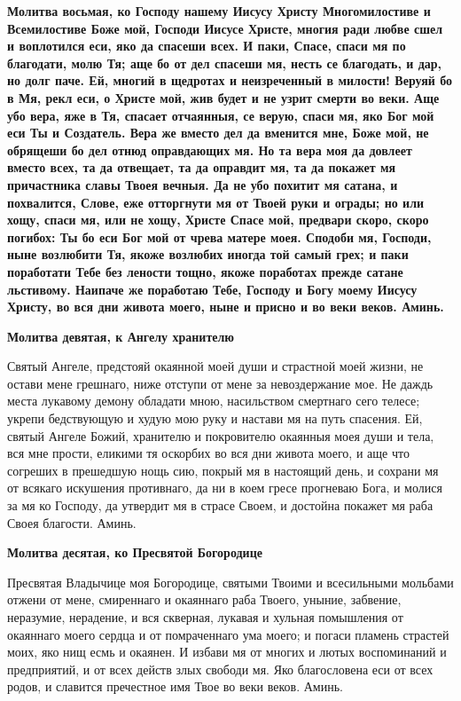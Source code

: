 \medskip
\bfseries Молитва восьмая, ко Господу нашему Иисусу Христу\normalfont{}
Многомилостиве и Всемилостиве Боже мой, Господи Иисусе Христе, многия ради любве сшел и воплотился еси, яко да спасеши всех. И паки, Спасе, спаси мя по благодати, молю Тя; аще бо от дел спасеши мя, несть се благодать, и дар, но долг паче. Ей, многий в щедротах и неизреченный в милости! Веруяй бо в Мя, рекл еси, о Христе мой, жив будет и не узрит смерти во веки. Аще убо вера, яже в Тя, спасает отчаянныя, се верую, спаси мя, яко Бог мой еси Ты и Создатель. Вера же вместо дел да вменится мне, Боже мой, не обрящеши бо дел отнюд оправдающих мя. Но та вера моя да довлеет вместо всех, та да отвещает, та да оправдит мя, та да покажет мя причастника славы Твоея вечныя. Да не убо похитит мя сатана, и похвалится, Слове, еже отторгнути мя от Твоей руки и ограды; но или хощу, спаси мя, или не хощу, Христе Спасе мой, предвари скоро, скоро погибох: Ты бо еси Бог мой от чрева матере моея. Сподоби мя, Господи, ныне возлюбити Тя, якоже возлюбих иногда той самый грех; и паки поработати Тебе без лености тощно, якоже поработах прежде сатане льстивому. Наипаче же поработаю Тебе, Господу и Богу моему Иисусу Христу, во вся дни живота моего, ныне и присно и во веки веков. Аминь. 


\medskip
\bfseries Молитва девятая, к Ангелу хранителю\normalfont{}


Святый Ангеле, предстояй окаянной моей души и страстной моей жизни, не остави мене грешнаго, ниже отступи от мене за невоздержание мое. Не даждь места лукавому демону обладати мною, насильством смертнаго сего телесе; укрепи бедствующую и худую мою руку и настави мя на путь спасения. Ей, святый Ангеле Божий, хранителю и покровителю окаянныя моея души и тела, вся мне прости, еликими тя оскорбих во вся дни живота моего, и аще что согреших в прешедшую нощь сию, покрый мя в настоящий день, и сохрани мя от всякаго искушения противнаго, да ни в коем гресе прогневаю Бога, и молися за мя ко Господу, да утвердит мя в страсе Своем, и достойна покажет мя раба Своея благости. Аминь. 


\medskip
\bfseries Молитва десятая, ко Пресвятой Богородице\normalfont{}


Пресвятая Владычице моя Богородице, святыми Твоими и всесильными мольбами отжени от мене, смиреннаго и окаяннаго раба Твоего, уныние, забвение, неразумие, нерадение, и вся скверная, лукавая и хульная помышления от окаяннаго моего сердца и от помраченнаго ума моего; и погаси пламень страстей моих, яко нищ есмь и окаянен. И избави мя от многих и лютых воспоминаний и предприятий, и от всех действ злых свободи мя. Яко благословена еси от всех родов, и славится пречестное имя Твое во веки веков. Аминь. 


